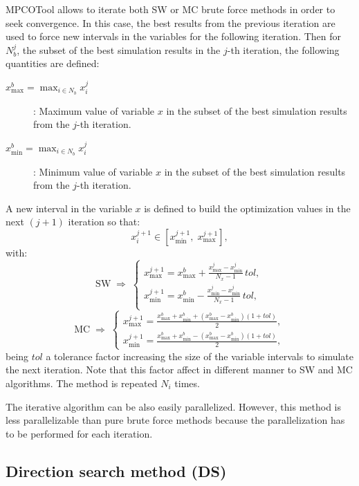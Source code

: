 \documentclass[review,authoryear]{elsarticle}
\newcommand{\EQ}[2]
{\begin{equation}#1\label{#2}\end{equation}}
\begin{document}
MPCOTool allows to iterate both SW or MC brute force methods in
order to seek convergence. In this case, the best results from the previous
iteration are used to force new intervals in the variables for the following
iteration. Then for $N_b^j$, the subset of the best simulation results in
the $j$-th iteration, the following quantities are defined:
\begin{description}
\item[$\displaystyle x_{\max}^b=\max_{i\in N_b}x_i^j$]: Maximum value of
	variable $x$ in the subset of the best simulation results from the $j$-th
	iteration.
\item[$\displaystyle x_{\min}^b=\max_{i\in N_b}x_i^j$]: Minimum value of
	variable $x$ in the subset of the best simulation results from the $j$-th
	iteration.
\end{description}
A new interval in the variable $x$ is defined to build the optimization values in the next $(j+1)$ iteration so that:
\EQ{x_i^{j+1}\in\left[x_{\min}^{j+1},\;x_{\max}^{j+1}\right],}
{EqIterationInterval}
with:
\[
	\mathrm{SW}\;\Rightarrow\;\left\{\begin{array}{c}
	\displaystyle
	x_{\max}^{j+1}=x_{\max}^b+\frac{x_{\max}^j-x_{\min}^j}{N_x-1}\,tol,\\
	\displaystyle
	x_{\min}^{j+1}=x_{\min}^b-\frac{x_{\min}^j-x_{\min}^j}{N_x-1}\,tol,\\
	\end{array}\right.
\]
\EQ
{
	\mathrm{MC}\;\Rightarrow\;\left\{\begin{array}{c}
	\displaystyle x_{\max}^{j+1}=\frac{x_{\max}^b+x_{\min}^b
	+\left(x_{\max}^b-x_{\min}^b\right)(1+tol)}{2},\\
	\displaystyle x_{\min}^{j+1}=\frac{x_{\max}^b+x_{\min}^b
	-\left(x_{\max}^b-x_{\min}^b\right)(1+tol)}{2},
	\end{array}\right.
}{EqIterationTolerance}
being $tol$ a tolerance factor increasing the size of the variable intervals to
simulate the next iteration. Note that this factor affect in different manner to
SW and MC algorithms. The method is repeated $N_i$ times.

The iterative algorithm can be also easily parallelized. However, this method is
less parallelizable than pure brute force methods because the parallelization
has to be performed for each iteration.

\subsection{Direction search method (DS)}
\end{document}
